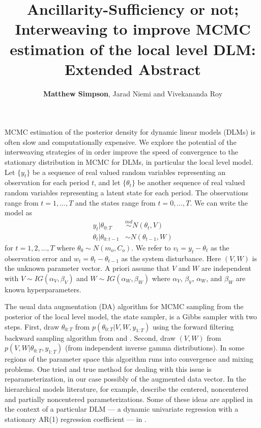 \documentclass{article}\usepackage{graphicx, color}
\begin{document}
\title{Ancillarity-Sufficiency or not; Interweaving to improve MCMC estimation of the local level DLM: Extended Abstract}
\author{{\bf Matthew Simpson}, Jarad Niemi and Vivekananda Roy}
\maketitle


MCMC estimation of the posterior density for dynamic linear models (DLMs) is often slow and computationally expensive. We explore the potential of the interweaving strategies of \cite{yu2011center} in order improve the speed of convergence to the stationary distribution in MCMC for DLMs, in particular the local level model. Let $\{y_t\}$ be a sequence of real valued random variables representing an observation for each period $t$, and let $\{\theta_t\}$ be another sequence of real valued random variables representing a latent state for each period.  The observations range from $t=1,...,T$ and the states range from $t=0,...,T$. We can write the model as
\begin{align*}
  y_t |\theta_{0:T}& \stackrel{ind}{\sim} N(\theta_t,V) \\
  \theta_t |\theta_{0:t-1}& \sim N(\theta_{t-1},W)
\end{align*}
for $t=1,2,...,T$ where $\theta_0\sim N(m_o,C_o)$. We refer to $v_t=y_t-\theta_t$ as the observation error and $w_t=\theta_t-\theta_{t-1}$ as the system disturbance. Here $(V,W)$ is the unknown parameter vector. A priori assume that $V$ and $W$ are independent with $V\sim IG(\alpha_V, \beta_V)$ and $W\sim IG(\alpha_W, \beta_W)$ where $\alpha_V$, $\beta_V$, $\alpha_W$, and $\beta_W$ are known hyperparameters.

The usual data augmentation (DA) algorithm for MCMC sampling from the posterior of the local level model, the state sampler, is a Gibbs sampler with two steps. First, draw $\theta_{0:T}$ from $p(\theta_{0:T}|V,W,y_{1:T})$ using the forward filtering backward sampling algorithm from \cite{fruhwirth1994data} and \cite{carter1994gibbs}. Second, draw $(V,W)$ from $p(V,W|\theta_{0:T}, y_{1:T})$ (from independent inverse gamma distributions). In some regions of the parameter space this algorithm runs into convergence and mixing problems. One tried and true method for dealing with this issue is reparameterization, in our case possibly of the augmented data vector. In the hierarchical models literature, for example, \cite{papaspiliopoulos2007general} describe the centered, noncentered and partially noncentered parameterizations. Some of these ideas are applied in the context of a particular DLM  --- a dynamic univariate regression with a stationary AR(1) regression coefficient --- in \cite{fruhwirth2004efficient}.
\end{document}

